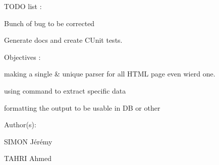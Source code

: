 T\+O\+D\+O list \+:
\begin{DoxyItemize}
\item Bunch of bug to be corrected
\item Generate docs and create C\+Unit tests.
\end{DoxyItemize}

Objectives \+:
\begin{DoxyItemize}
\item making a single \& unique parser for all H\+T\+M\+L page even wierd one.
\item using command to extract specific data
\item formatting the output to be usable in D\+B or other
\end{DoxyItemize}

Author(s)\+:
\begin{DoxyItemize}
\item S\+I\+M\+O\+N Jérémy
\item T\+A\+H\+R\+I Ahmed 
\end{DoxyItemize}